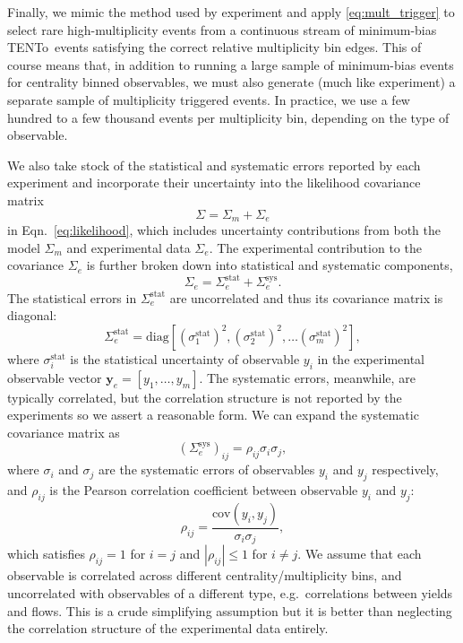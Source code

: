 \documentclass[aps,prc,reprint,amsmath,nofootinbib]{revtex4-1}
\newcommand{\trento}{T\raisebox{-0.5ex}{R}ENTo}
\newcommand{\y}{\mathbf{y}}
\begin{document}
Finally, we mimic the method used by experiment and apply \eqref{eq:mult_trigger} to select rare high-multiplicity events from a continuous stream of minimum-bias \trento\ events satisfying the correct relative multiplicity bin edges.
This of course means that, in addition to running a large sample of minimum-bias events for centrality binned observables, we must also generate (much like experiment) a separate sample of multiplicity triggered events.
In practice, we use a few hundred to a few thousand events per multiplicity bin, depending on the type of observable.

We also take stock of the statistical and systematic errors reported by each experiment and incorporate their uncertainty into the likelihood covariance matrix
\begin{equation}
  \Sigma = \Sigma_m + \Sigma_e
\end{equation}
in Eqn.~\eqref{eq:likelihood}, which includes uncertainty contributions from both the model $\Sigma_m$ and experimental data $\Sigma_e$.
The experimental contribution to the covariance $\Sigma_e$ is further broken down into statistical and systematic components,
\begin{equation}
  \Sigma_e = \Sigma_e^\text{stat} + \Sigma_e^\text{sys}.
\end{equation}
The statistical errors in $\Sigma_e^\text{stat}$ are uncorrelated and thus its covariance matrix is diagonal:
\begin{equation}
  \Sigma_e^\text{stat} = \text{diag}[(\sigma^\text{stat}_1)^2, (\sigma^\text{stat}_2)^2, \dots (\sigma^\text{stat}_m)^2 ],
\end{equation}
where $\sigma^\text{stat}_i$ is the statistical uncertainty of observable $y_i$ in the experimental observable vector $\y_e = [y_1, \dots, y_m]$.
The systematic errors, meanwhile, are typically correlated, but the correlation structure is not reported by the experiments so we assert a reasonable form.
We can expand the systematic covariance matrix as
\begin{equation}
  (\Sigma_e^\text{sys})_{ij} =  \rho_{ij} \sigma_i \sigma_j,
\end{equation}
where $\sigma_i$ and $\sigma_j$ are the systematic errors of observables $y_i$ and $y_j$ respectively, and $\rho_{ij}$ is the Pearson correlation coefficient between observable $y_i$ and $y_j$:
\begin{equation}
  \rho_{ij} = \frac{\text{cov}(y_i, y_j)}{\sigma_i \sigma_j},
\end{equation}
which satisfies $\rho_{ij}=1$ for $i=j$ and $|\rho_{ij}| \le 1$ for $i \ne j$.
We assume that each observable is correlated across different centrality/multiplicity bins, and uncorrelated with observables of a different type, e.g.\ correlations between yields and flows.
This is a crude simplifying assumption but it is better than neglecting the correlation structure of the experimental data entirely.
\end{document}
